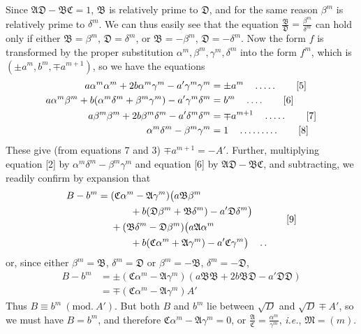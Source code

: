 Since $\mathfrak{A}\mathfrak{D}-\mathfrak{B}\mathfrak{C}=1$, $\mathfrak{B}$ is relatively prime to $\mathfrak{D}$, and for the same reason $\beta^m$ is relatively prime to $\delta^m$. We can thus easily see that the equation $\frac{\mathfrak{B}}{\mathfrak{D}}=\frac{\beta^m}{\delta^m}$ can hold only if either $\mathfrak{B}=\beta^m$, $\mathfrak{D}=\delta^m$, or $\mathfrak{B}=-\beta^m$, $\mathfrak{D}=-\delta^m$. Now the form $f$ is transformed by the proper substitution $\alpha^m,\beta^m,\gamma^m,\delta^m$ into the form $f^m$, which is $(\pm a^m,b^m,\mp a^{m+1})$, so we have the equations
\begin{align*}
a\alpha^m\alpha^m+2b\alpha^m\gamma^m-a'\gamma^m\gamma^m&=\pm a^m \quad \mathinner{\ldotp\ldotp\ldotp\ldotp\ldotp} \tag*{[5]}\\
a\alpha^m\beta^m+b(\alpha^m\delta^m+\beta^m\gamma^m)-a'\gamma^m\delta^m&=b^m \quad \mathinner{\ldotp\ldotp\ldotp\ldotp} \tag*{[6]}\\
a\beta^m\beta^m+2b\beta^m\delta^m-a'\delta^m\delta^m&=\mp a^{m+1} \quad \mathinner{\ldotp\ldotp\ldotp\ldotp\ldotp} \tag*{[7]}\\
\alpha^m\delta^m-\beta^m\gamma^m&=1 \quad \mathinner{\ldotp\ldotp\ldotp\ldotp\ldotp\ldotp\ldotp\ldotp\ldotp} \tag*{[8]}
\end{align*}
These give (from equations 7 and 3) $\mp a^{m+1}=-A'$. Further, multiplying equation [2] by $\alpha^m\delta^m-\beta^m\gamma^m$ and equation [6] by $\mathfrak{A}\mathfrak{D}-\mathfrak{B}\mathfrak{C}$, and subtracting, we readily confirm by expansion that
\begin{equation*}
\begin{aligned}
B-b^m={}&(\mathfrak{C}\alpha^m-\mathfrak{A}\gamma^m)\bigl(a\mathfrak{B}\beta^m\\
&\qquad+b(\mathfrak{D}\beta^m+\mathfrak{B}\delta^m)-a'\mathfrak{D}\delta^m\bigr)\\
&+(\mathfrak{B}\delta^m-\mathfrak{D}\beta^m)\bigl(a\mathfrak{A}\alpha^m\\
&\qquad+b(\mathfrak{C}\alpha^m+\mathfrak{A}\gamma^m)-a'\mathfrak{C}\gamma^m\bigr)
\quad \mathinner{\ldotp\ldotp}
\end{aligned}
\tag*{[9]}
\end{equation*}
or, since either $\beta^m=\mathfrak{B}$, $\delta^m=\mathfrak{D}$ or $\beta^m=-\mathfrak{B}$, $\delta^m=-\mathfrak{D}$,
\[
\begin{aligned}
B-b^m&=\pm(\mathfrak{C}\alpha^m-\mathfrak{A}\gamma^m)(a\mathfrak{B}\mathfrak{B}+2b\mathfrak{B}\mathfrak{D}-a'\mathfrak{D}\mathfrak{D})\\
&=\mp(\mathfrak{C}\alpha^m-\mathfrak{A}\gamma^m)A'
\end{aligned}
\]
Thus $B\equiv b^m\ (\mathrm{mod.}\ A')$. But both $B$ and $b^m$ lie between $\surd D$ and $\surd D\mp A'$, so we must have $B=b^m$, and therefore $\mathfrak{C}\alpha^m-\mathfrak{A}\gamma^m=0$, or $\frac{\mathfrak{A}}{\mathfrak{C}}=\frac{\alpha^m}{\gamma^m}$, \textit{i.e.}, $\mathfrak{M}=(m)$.


